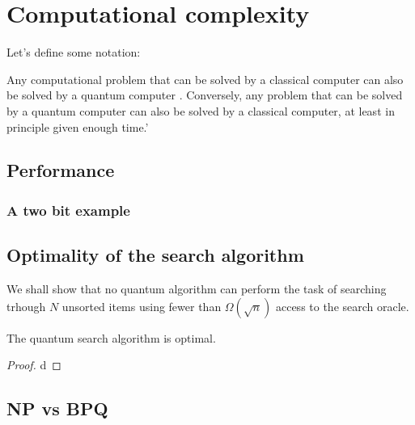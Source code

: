 \section{Computational complexity}
Let's define some notation:

Any computational problem that can be solved by a classical computer can also be solved by a quantum computer \cite[29]{NielsenChuang}. Conversely, any problem that can be solved by a quantum computer can also be solved by a classical computer, at least in principle given enough time.'
\subsection{Performance}\label{sec:performance}
\subsubsection{A two bit example}

\subsection{Optimality of the search algorithm}
We shall show that no quantum algorithm can perform the task of searching trhough $N$ unsorted items using fewer than $\Omega(\sqrt{n})$ access to the search oracle.
\begin{theorem}
The quantum search algorithm is optimal. 
\end{theorem}
\begin{proof}
d
\end{proof}
\subsection{NP vs BPQ}